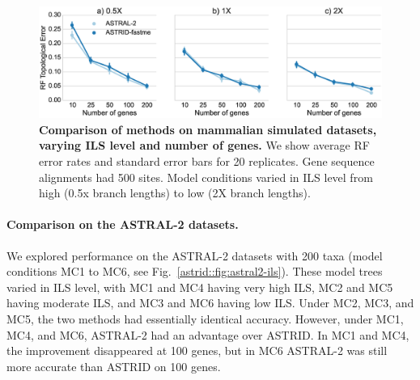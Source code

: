 \begin{figure}
  \centering
  \includegraphics[width=12cm]{astrid-figs/mammalian-ils.eps}
  \caption[Comparison of methods on mammalian simulated datasets, varying ILS level and number of genes]{\textbf{Comparison of methods on mammalian simulated datasets, varying ILS level and number of genes.}  We
show average RF error rates and standard error bars for 20 replicates. 
Gene sequence alignments had
    500 sites. Model conditions varied in ILS level
from high (0.5x branch lengths) to low (2X branch lengths).
}
  \label{astrid::fig:mammalian-ils}
\end{figure}

\paragraph{Comparison on the ASTRAL-2 datasets. }
We explored performance on the ASTRAL-2 datasets
with 200 taxa (model conditions MC1 to MC6, see
Fig.~\ref{astrid::fig:astral2-ils}). %
These model trees varied in ILS level, with MC1 and MC4 having 
very high ILS, MC2 and MC5 having moderate ILS, and
MC3 and MC6 having low ILS. 
Under MC2, MC3, and MC5, the two methods had 
essentially identical accuracy. However, under MC1, MC4, and MC6, 
ASTRAL-2 had an advantage over ASTRID.
In MC1 and MC4, the improvement disappeared at 100 genes,
but in MC6 ASTRAL-2 was still more accurate than ASTRID on 100 genes.


